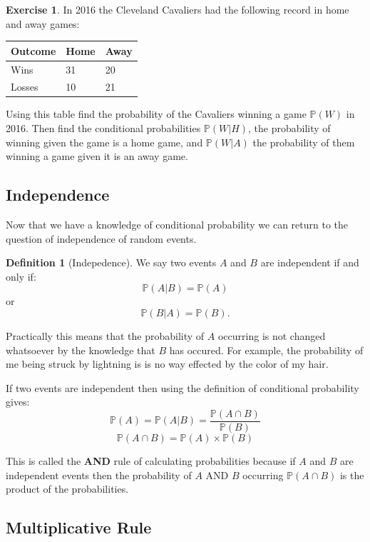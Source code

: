 \documentclass[
]{book}
\newcommand{\prob}[1]{{\mathbb{P}(#1)}}
\newcommand{\condprob}[2]{{\prob{#1|#2}=\frac{\prob{#1 \cap #2}}{\prob{#2}}}}
\theoremstyle{definition}
\newtheorem{definition}{Definition}[chapter]
\theoremstyle{definition}
\theoremstyle{definition}
\newtheorem{exercise}{Exercise}[chapter]
\theoremstyle{definition}
\theoremstyle{remark}
\begin{document}
\begin{exercise}
\protect\hypertarget{exr:unnamed-chunk-239}{}\label{exr:unnamed-chunk-239}In 2016 the Cleveland Cavaliers had the following record in home and away games:

\begin{longtable}[]{@{}lll@{}}
\toprule()
Outcome & Home & Away \\
\midrule()
\endhead
Wins & 31 & 20 \\
Losses & 10 & 21 \\
\bottomrule()
\end{longtable}

Using this table find the probability of the Cavaliers winning a game \(\prob{W}\) in 2016. Then find the conditional probabilities \(\prob{W|H}\), the probability of winning given the game is a home game, and \(\prob{W|A}\) the probability of them winning a game given it is an away game.
\end{exercise}

\hypertarget{independence}{%
\subsection{Independence}\label{independence}}

Now that we have a knowledge of conditional probability we can return to the question of independence of random events.

\begin{definition}[Indepedence]
\protect\hypertarget{def:unnamed-chunk-240}{}\label{def:unnamed-chunk-240}We say two events \(A\) and \(B\) are independent if and only if: \[\prob{A|B}=\prob{A}\] or \[\prob{B|A}=\prob{B}.\]
\end{definition}

Practically this means that the probability of \(A\) occurring is not changed whatsoever by the knowledge that \(B\) has occured. For example, the probability of me being struck by lightning is is no way effected by the color of my hair.

If two events are independent then using the definition of conditional probability gives:
\[ \prob{A}=\condprob{A}{B} \]
\[ \prob{A\cap B}=\prob{A} \times \prob{B} \]

This is called the \textbf{AND} rule of calculating probabilities because if \(A\) and \(B\) are independent events then the probability of \(A\) AND \(B\) occurring \(\prob{A \cap B}\) is the product of the probabilities.

\hypertarget{multiplicative-rule}{%
\subsection{Multiplicative Rule}\label{multiplicative-rule}}
\end{document}
